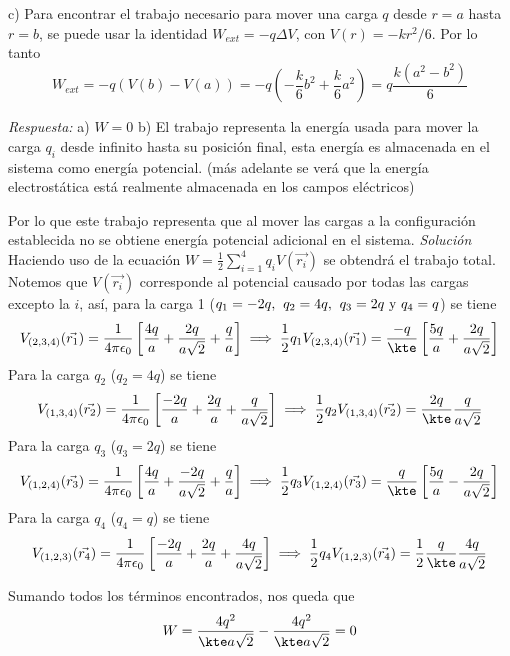 \bigbreak
c) Para encontrar el trabajo necesario para mover una carga $q$ desde $r =a$ hasta $r=b$, se puede usar la identidad $W_{ext} = -q \Delta V$, con $V(r) = -kr^2/6$. Por lo tanto
\[W_{ext} = -q(V(b) - V(a)) = -q\left( -\frac{k}{6}b^2 + \frac{k}{6}a^2 \right) = q\frac{k(a^2 - b^2)}{6}\]

\bigbreak


\newline\newline
\textit{Respuesta:} \newline\newline
a) $W = 0$
\newline
\newline
b) El trabajo representa la energía usada para mover la carga $q_i$ desde infinito hasta su posición final, esta energía es almacenada en el sistema como energía potencial. (más adelante se verá que la energía electrostática está realmente almacenada en los campos eléctricos)

Por lo que este trabajo representa que al mover las cargas a la configuración establecida no se obtiene energía potencial adicional en el sistema.
\newline
\newline
\textit{Solución}
\newline
\newline
Haciendo uso de la ecuación $W = \frac{1}{2}\sum_{i=1}^4q_iV(\Vec{r_i})$ se obtendrá el trabajo total. Notemos que $V(\Vec{r_i})$ corresponde al potencial causado por todas las cargas excepto la $i$, así, para la carga 1 ($q_1 = -2q, \hspace{4px} q_2 = 4q, \hspace{4px} q_3 = 2q \text{  y  } q_4 = q$) se tiene
\[V_{(2,3,4)}(\Vec{r_1}) = \frac{1}{4\pi\epsilon_0}\left[\frac{4q}{a} + \frac{2q}{a\sqrt{2}} + \frac{q}{a} \right] \implies \frac{1}{2}q_1V_{(2,3,4)}(\Vec{r_1})= \frac{-q}{\kte}\left[ \frac{5q}{a} + \frac{2q}{a\sqrt{2}}\right]\]
\newline Para la carga $q_2$ ($q_2 = 4q$) se tiene
\[V_{(1,3,4)}(\Vec{r_2}) = \frac{1}{4\pi\epsilon_0}\left[\frac{-2q}{a} + \frac{2q}{a} + \frac{q}{a\sqrt{2}} \right] \implies \frac{1}{2}q_2V_{(1,3,4)}(\Vec{r_2})= \frac{2q}{\kte} \frac{q}{a\sqrt{2}}\]
\newline Para la carga $q_3$ ($q_3 = 2q$) se tiene
\[V_{(1,2,4)}(\Vec{r_3}) = \frac{1}{4\pi\epsilon_0}\left[\frac{4q}{a} + \frac{-2q}{a\sqrt{2}} + \frac{q}{a} \right] \implies \frac{1}{2}q_3V_{(1,2,4)}(\Vec{r_3})= \frac{q}{\kte}\left[ \frac{5q}{a} - \frac{2q}{a\sqrt{2}}\right]\]
\newline Para la carga $q_4$ ($q_4 = q$) se tiene
\[V_{(1,2,3)}(\Vec{r_4}) = \frac{1}{4\pi\epsilon_0}\left[\frac{-2q}{a} + \frac{2q}{a} + \frac{4q}{a\sqrt{2}} \right] \implies \frac{1}{2}q_4V_{(1,2,3)}(\Vec{r_4})= \frac{1}{2}\frac{q}{\kte} \frac{4q}{a\sqrt{2}}\]

Sumando todos los términos encontrados, nos queda que 
\[W = \frac{4q^2}{\kte a \sqrt{2}} - \frac{4q^2}{\kte a \sqrt{2}} = 0\]


\newpage